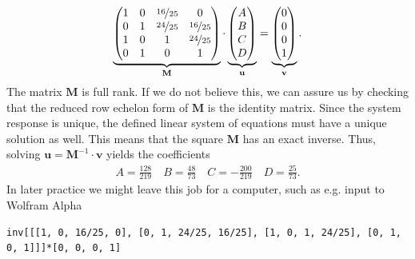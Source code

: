 %
%
%
\begin{align}
\underbrace{
\begin{pmatrix}
1 & 0 & \nicefrac{16}{25} & 0\\
0 & 1 & \nicefrac{24}{25} & \nicefrac{16}{25}\\
1 & 0 & 1 & \nicefrac{24}{25}\\
0 & 1 & 0 & 1
\end{pmatrix}
}_{\mathbf{M}}
\cdot
\underbrace{
\begin{pmatrix}
A \\
B\\
C\\
D
\end{pmatrix}
}_{\mathbf{u}}
=
\underbrace{
\begin{pmatrix}
0\\
0\\
0\\
1
\end{pmatrix}
}_{\mathbf{v}}
.
\end{align}
%
The matrix $\mathbf{M}$ is full rank.
%
If we do not believe this, we can assure us by checking that the reduced row echelon
form of $\mathbf{M}$ is the identity matrix.
%
Since the system response is unique, the defined linear system of equations must
have a unique solution as well.
%
This means that the square $\mathbf{M}$ has an exact inverse.
%
Thus, solving $\mathbf{u} = \mathbf{M}^{-1} \cdot \mathbf{v}$ yields the coefficients
\begin{align}
\label{eq:coeffABCDsinLaplace}
  A = \frac{128}{219}
  \quad B = \frac{48}{73}
  \quad C = -\frac{200}{219}
  \quad D = \frac{25}{73}.
\end{align}
%
In later practice
we might leave this job for a computer, such as e.g. input to Wolfram Alpha
\begin{verbatim}
inv[[[1, 0, 16/25, 0], [0, 1, 24/25, 16/25], [1, 0, 1, 24/25], [0, 1, 0, 1]]]*[0, 0, 0, 1]
\end{verbatim}

